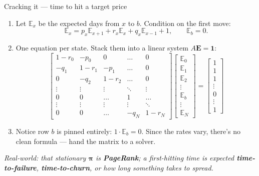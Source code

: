 \documentclass[aspectratio=169,10pt]{beamer}
\newif\ifkick \kickfalse
\newcommand{\kick}[1]{\def\thekicker{#1}\kicktrue}
\begin{document}
\begin{frame}[t]{Cracking it --- time to hit a target price}
\kick{Scenario 3 \ \textbullet\ \ tactic: it's just $A\mathbf{E}=\mathbf{1}$}
\footnotesize
\begin{enumerate}[<+->]\setlength\itemsep{3pt}
  \item Let $\mathbb{E}_x$ be the expected days from $x$ to $b$. Condition on the first move:
    \[ \mathbb{E}_x=p_x \mathbb{E}_{x+1}+r_x \mathbb{E}_x+q_x \mathbb{E}_{x-1}+1,\qquad \mathbb{E}_b=0. \]
  \item One equation per state. Stack them into a linear system $A\mathbf{E} = \mathbf{1}$:
    \vspace{-0.2em}
    {\scriptsize
    \[
    \begin{bmatrix}
    1-r_0 & -p_0 & 0 & \dots & 0 \\
    -q_1 & 1-r_1 & -p_1 & \dots & 0 \\
    0 & -q_2 & 1-r_2 & \dots & 0 \\
    \vdots & \vdots & \vdots & \ddots & \vdots \\
    0 & 0 & \dots & 1 & \dots \\
    \vdots & \vdots & \vdots & \vdots & \ddots \\
    0 & 0 & \dots & -q_N & 1-r_N
    \end{bmatrix}
    \begin{bmatrix} \mathbb{E}_0 \\ \mathbb{E}_1 \\ \mathbb{E}_2 \\ \vdots \\ \mathbb{E}_b \\ \vdots \\ \mathbb{E}_N \end{bmatrix}
    =
    \begin{bmatrix} 1 \\ 1 \\ 1 \\ \vdots \\ 0 \\ \vdots \\ 1 \end{bmatrix}
    \]}
    \vspace{-0.2em}
  \item Notice row $b$ is pinned entirely: $1 \cdot \mathbb{E}_b = 0$. Since the rates vary, there's no clean formula --- hand the matrix to a solver.
\end{enumerate}
\vspace{0.2em}
{\centering\scriptsize\textcolor{cSlate}{\itshape Real-world: that stationary $\boldsymbol\pi$ is \textbf{PageRank}; a first-hitting time is expected \textbf{time-to-failure}, \textbf{time-to-churn}, or how long something takes to spread.}\par}
\end{frame}
\end{document}
